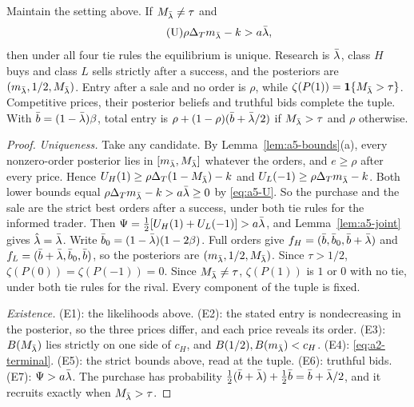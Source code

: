 \begin{lemma}\label{lem:a5-strong}
Maintain the setting above. If \(M_{\bar\lambda}\ne\tau\) and
{\renewcommand{\theHequation}{A.U}%
\begin{equation}\tag{U}\label{eq:a5-U}
 \rho\Delta_T m_{\bar\lambda}-k>a\bar\lambda,
\end{equation}}%
then under all four tie rules the equilibrium is unique. Research is \(\bar\lambda\), class \(H\) buys and class \(L\)
sells strictly after a success, and the posteriors are \((m_{\bar\lambda},1/2,M_{\bar\lambda})\). Entry after a sale and no order
is \(\rho\), while \(\zeta(P(1))=\mathbf{1}\{M_{\bar\lambda}>\tau\}\). Competitive prices, their posterior beliefs and
truthful bids complete the tuple. With \(\bar b=(1-\bar\lambda)\beta\), total entry is
\(\rho+(1-\rho)(\bar b+\bar\lambda/2)\) if \(M_{\bar\lambda}>\tau\) and \(\rho\) otherwise.
\end{lemma}

\begin{proof}
\emph{Uniqueness.} Take any candidate. By Lemma~\ref{lem:a5-bounds}(a), every nonzero-order posterior lies in
\([m_{\bar\lambda},M_{\bar\lambda}]\) whatever the orders, and \(e\ge\rho\) after every price. Hence
\(U_H(1)\ge\rho\Delta_T(1-M_{\bar\lambda})-k\) and \(U_L(-1)\ge\rho\Delta_T m_{\bar\lambda}-k\). Both lower bounds equal
\(\rho\Delta_T m_{\bar\lambda}-k>a\bar\lambda\ge0\) by \eqref{eq:a5-U}. So the purchase and the sale are the strict best orders after a
success, under both tie rules for the informed trader. Then \(\Psi=\tfrac12[U_H(1)+U_L(-1)]>a\bar\lambda\), and Lemma~\ref{lem:a5-joint} gives
\(\hat\lambda=\bar\lambda\). Write \(\bar b_0=(1-\bar\lambda)(1-2\beta)\). Full orders give
\(f_H=(\bar b,\bar b_0,\bar b+\bar\lambda)\) and \(f_L=(\bar b+\bar\lambda,\bar b_0,\bar b)\), so the
posteriors are \((m_{\bar\lambda},1/2,M_{\bar\lambda})\). Since \(\tau>1/2\), \(\zeta(P(0))=\zeta(P(-1))=0\). Since
\(M_{\bar\lambda}\ne\tau\), \(\zeta(P(1))\) is \(1\) or \(0\) with no tie, under both tie rules for the rival. Every component of
the tuple is fixed.

\emph{Existence.} (E1): the likelihoods above. (E2): the stated entry is nondecreasing in the posterior, so the
three prices differ, and each price reveals its order. (E3): \(B(M_{\bar\lambda})\) lies strictly on one side of \(c_H\),
and \(B(1/2),B(m_{\bar\lambda})<c_H\). (E4): \eqref{eq:a2-terminal}. (E5): the strict bounds above, read at the tuple.
(E6): truthful bids. (E7): \(\Psi>a\bar\lambda\). The purchase has probability \(\tfrac12(\bar b+\bar\lambda)+\tfrac12\bar b=\bar b+\bar\lambda/2\),
and it recruits exactly when \(M_{\bar\lambda}>\tau\).
\end{proof}

